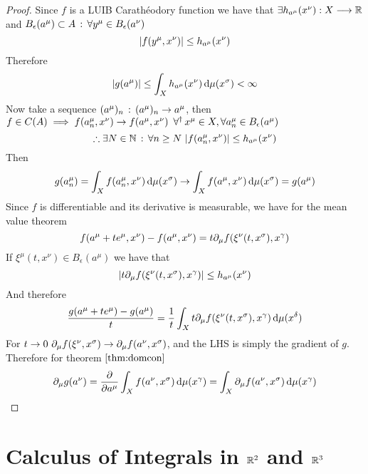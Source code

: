 \documentclass[../complete.tex]{subfiles}
\begin{document}
\begin{proof}
	Since $f$ is a LUIB Carathéodory function we have that $\exists h_{a^\mu}(x^\nu):X\overset{}{\longrightarrow}\mathbb{R}$ and $B_\epsilon(a^\mu)\subset A\, :\, \forall y^\mu\in B_\epsilon(a^\nu)$
	\begin{equation*}
		\abs{f(y^\mu,x^\nu)}\le h_{a^\mu}(x^\nu)
	\end{equation*}
	Therefore
	\begin{equation*}
		\abs{g(a^\mu)}\le\int_{X}^{}h_{a^\mu}(x^\nu)\operatorname{d\!}\mu(x^\sigma)<\infty
	\end{equation*}
	Now take a sequence $(a^\mu)_n\, :\,  (a^\mu)_n\to a^\mu$, then $f\in C(A)\implies f(a^\mu_n,x^\nu)\to f(a^\mu,x^\nu)\ \operatorname{\forall^\dagger} x^\mu\in X,\forall a^\mu_n\in B_\epsilon(a^\mu)$
	\begin{equation*}
		\therefore\exists N\in\N\st\forall n\ge N\ \abs{f(a^\mu_n,x^\nu)}\le h_{a^\mu}(x^\nu)
	\end{equation*}
	Then
	\begin{equation*}
		g(a^\mu_n)=\int_{X}^{}f(a^\mu_n,x^\nu)\operatorname{d\!}\mu(x^\sigma)\to\int_{X}^{}f(a^\mu,x^\nu)\operatorname{d\!}\mu(x^\sigma)=g(a^\mu)
	\end{equation*}
	Since $f$ is differentiable and its derivative is measurable, we have for the mean value theorem
	\begin{equation*}
		f(a^\mu+te^\mu,x^\nu)-f(a^\mu,x^\nu)=t\partial_\mu f(\xi^\nu(t,x^\sigma),x^\gamma)
	\end{equation*}
	If $\xi^\mu(t,x^\nu)\in B_\epsilon(a^\mu)$ we have that
	\begin{equation*}
		\abs{t\partial_\mu f(\xi^\nu(t,x^\sigma),x^\gamma)}\le h_{a^\mu}(x^\nu)
	\end{equation*}
	And therefore
	\begin{equation*}
		\frac{g(a^\mu+te^\mu)-g(a^\mu)}{t}=\frac{1}{t}\int_{X}^{}t\partial_\mu f(\xi^\nu(t,x^\sigma),x^\gamma)\operatorname{d\!}\mu(x^\delta)
	\end{equation*}
	For $t\to0\ \partial_\mu f(\xi^\nu,x^\sigma)\to\partial_\mu f(a^\nu,x^\sigma)$, and the LHS is simply the gradient of $g$. Therefore for theorem $\eqref{thm:domcon}$
	\begin{equation*}
		\partial_\mu g(a^\nu)=\pdv{a^\mu}\int_{X}f(a^\nu,x^\sigma)\operatorname{d\!}\mu(x^\gamma)=\int_{X}^{}\partial_{\mu}f(a^\nu,x^\sigma)\operatorname{d\!}\mu(x^\gamma)
	\end{equation*}
\end{proof}
\section{Calculus of Integrals in $\mathbb{R}^2$ and $\mathbb{R}^3$}
\end{document}

